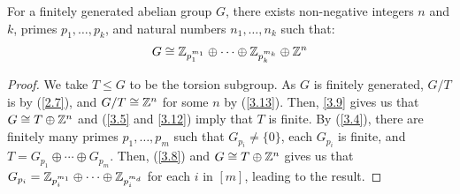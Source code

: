 For a finitely generated abelian group $G$, there exists
non-negative integers $n$ and $k$, primes $p_1, \ldots, p_k$, and
natural numbers $n_1, \ldots, n_k$ such that: \begin{align*}
    G \cong \mathbb{Z}_{p_1^{m_1}} \oplus \cdots 
    \oplus \mathbb{Z}_{p_k^{m_k}} \oplus \mathbb{Z}^n
\end{align*}

\begin{proof}
    We take $T \leq G$ to be the torsion subgroup. As $G$ is finitely generated,
    $G / T$ is by (\ref{2.7}), and $G / T \cong \mathbb{Z}^n$ for some
    $n$ by (\ref{3.13}). Then, \ref{3.9} gives us that $G \cong T \oplus \mathbb{Z}^n$
    and (\ref{3.5} and \ref{3.12}) imply that $T$ is finite. 
    By (\ref{3.4}), there are finitely many primes $p_1, \ldots, p_m$ such that
    $G_{p_i} \neq \{0\}$, each $G_{p_i}$ is finite, and 
    $T = G_{p_1} \oplus \cdots \oplus G_{p_m}$. Then, (\ref{3.8}) and $G \cong T \oplus \mathbb{Z}^n$
    gives us that $G_{p_i} = \mathbb{Z}_{p_i^{m_1}} \oplus \cdots \oplus \mathbb{Z}_{p_i^{m_d}}$
    for each $i$ in $[m]$, leading to the result.
\end{proof}
